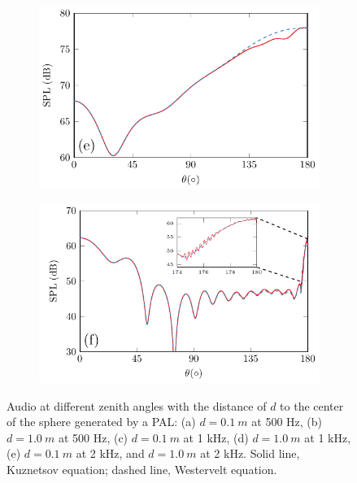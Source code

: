 \begin{figure}[!htb]
\begin{subfigure}{0.49\textwidth}
        \includegraphics[width = \textwidth]{fig/PalSphereAudio_211205D_TestTheta1D_Compare_r10cm_2000Hz_211206B.pdf}
    \end{subfigure}
    \begin{subfigure}{0.49\textwidth}
        \centering
        \includegraphics[width = \textwidth]{fig/PalSphereAudio_211205D_TestTheta1D_Compare_r100cm_2000Hz_211206F.pdf}
    \end{subfigure}
    \caption{Audio  at different zenith angles with the distance of $d$ to the center of the sphere generated by a PAL: (a) $d = \SI{0.1 }{m}$ at 500 Hz, (b) $d = \SI{1.0}{ m}$ at 500 Hz, (c) $d = \SI{0.1 }{m}$ at 1 kHz, (d) $d = \SI{1.0 }{m }$ at 1 kHz, (e) $d = \SI{0.1 }{m}$ at 2 kHz, and  $d = \SI{1.0 }{m }$ at 2 kHz. Solid line, Kuznetsov equation; dashed line, Westervelt equation.}
    \label{fig:scat_result_compare_eq}
\end{figure}

